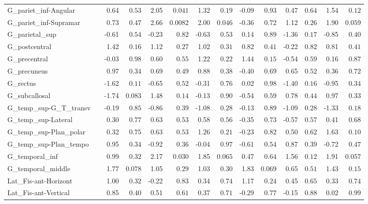 {\begin{longtable}{llrrrrrrrrrrrr}
G\_pariet\_inf-Angular &  & 0.64 & $0.53$ & 2.05 & $0.041$ & 1.32 & $0.19$ & -0.09 & $0.93$ & 0.47 & $0.64$ & 1.54 & $0.12$ \\
G\_pariet\_inf-Supramar &  & 0.73 & $0.47$ & 2.66 & $0.0082$ & 2.00 & $0.046$ & -0.36 & $0.72$ & 1.12 & $0.26$ & 1.90 & $0.059$ \\
G\_parietal\_sup &  & -0.61 & $0.54$ & -0.23 & $0.82$ & -0.63 & $0.53$ & 0.14 & $0.89$ & -1.36 & $0.17$ & -0.85 & $0.40$ \\
G\_postcentral &  & 1.42 & $0.16$ & 1.12 & $0.27$ & 1.02 & $0.31$ & 0.82 & $0.41$ & -0.22 & $0.82$ & 0.81 & $0.41$ \\
G\_precentral &  & -0.03 & $0.98$ & 0.60 & $0.55$ & 1.22 & $0.22$ & 1.44 & $0.15$ & -0.54 & $0.59$ & 0.16 & $0.87$ \\
G\_precuneus &  & 0.97 & $0.34$ & 0.69 & $0.49$ & 0.88 & $0.38$ & -0.40 & $0.69$ & 0.65 & $0.52$ & 0.36 & $0.72$ \\
G\_rectus &  & -1.62 & $0.11$ & -0.65 & $0.52$ & -0.31 & $0.76$ & 0.02 & $0.98$ & -1.40 & $0.16$ & -0.95 & $0.34$ \\
G\_subcallosal &  & -1.74 & $0.083$ & 1.48 & $0.14$ & -0.13 & $0.90$ & -0.54 & $0.59$ & 0.78 & $0.44$ & 0.97 & $0.33$ \\
G\_temp\_sup-G\_T\_transv &  & -0.19 & $0.85$ & -0.86 & $0.39$ & -1.08 & $0.28$ & -0.13 & $0.89$ & -1.09 & $0.28$ & -1.33 & $0.18$ \\
G\_temp\_sup-Lateral &  & 0.30 & $0.77$ & 0.63 & $0.53$ & 0.58 & $0.56$ & -0.35 & $0.73$ & -0.57 & $0.57$ & 0.41 & $0.68$ \\
G\_temp\_sup-Plan\_polar &  & 0.32 & $0.75$ & 0.63 & $0.53$ & 1.26 & $0.21$ & -0.23 & $0.82$ & 0.50 & $0.62$ & 1.63 & $0.10$ \\
G\_temp\_sup-Plan\_tempo &  & 0.95 & $0.34$ & -0.92 & $0.36$ & -0.04 & $0.97$ & -0.61 & $0.54$ & 0.87 & $0.39$ & -0.72 & $0.47$ \\
G\_temporal\_inf &  & 0.99 & $0.32$ & 2.17 & $0.030$ & 1.85 & $0.065$ & 0.47 & $0.64$ & 1.56 & $0.12$ & 1.91 & $0.057$ \\
G\_temporal\_middle &  & 1.77 & $0.078$ & 1.05 & $0.29$ & 1.03 & $0.30$ & 1.83 & $0.069$ & 0.65 & $0.51$ & 1.43 & $0.15$ \\
Lat\_Fis-ant-Horizont &  & 1.00 & $0.32$ & -0.22 & $0.83$ & 0.34 & $0.74$ & 1.17 & $0.24$ & 0.45 & $0.65$ & 0.33 & $0.74$ \\
Lat\_Fis-ant-Vertical &  & 0.85 & $0.40$ & 0.51 & $0.61$ & 0.37 & $0.71$ & -0.29 & $0.77$ & -0.15 & $0.88$ & 0.02 & $0.99$ \\

\end{longtable}}
